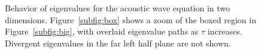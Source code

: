 \documentclass[preprint,10pt]{elsarticle}
\begin{document}
\begin{figure}
\centering
{}
\hspace{2em}
\caption{Behavior of eigenvalues for the acoustic wave equation in two dimensions.  Figure~\ref{subfig:box} shows a zoom of the boxed region in Figure~\ref{subfig:big}, with overlaid eigenvalue paths as $\tau$ increases.  Divergent eigenvalues in the far left half plane are not shown.  }
\label{fig:trackEigsWave}
\end{figure}
\end{document}
